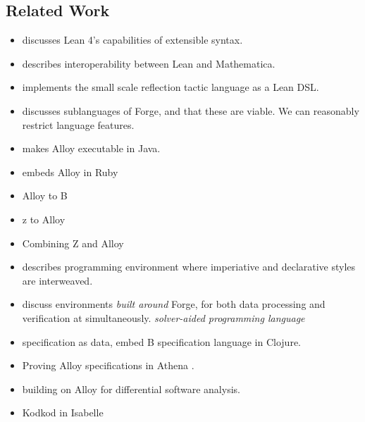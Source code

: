 \subsection{Related Work}\label{sec:bg-related}
{\color{OliveGreen}
\begin{itemize}
    \item \cite{ullrich2022beyond} discusses Lean 4's capabilities of extensible syntax. 
    \item \cite{lewis2022bi} describes interoperability between Lean and Mathematica. 
    \item \cite{gladshtein2024small} implements the small scale reflection tactic language as a Lean DSL. 
    \item \cite{ngpdbccdlrrvwwk-oopsla-2024} discusses sublanguages of Forge, and that these are viable. We can reasonably restrict language features. 
    \item \cite{milicevic2010executable} makes Alloy executable in Java. 
    \item \cite{milicevic2014alpha} embeds Alloy in Ruby
    \item \cite{krings2018translation} Alloy to B 
    \item \cite{malik2010translating} z to Alloy
    \item \cite{mikhailov2002approach} Combining Z and Alloy
    \item \cite{milicevic2015advancing} describes programming environment where imperiative and declarative styles are interweaved. 
    \item \cite{st2023comparison} discuss environments \emph{built around} Forge, for both data processing and verification at simultaneously. \emph{solver-aided programming language}
    \item \cite{korner2022embedding} specification as data, embed B specification language in Clojure. 
    \item \cite{arkoudas2004integrating} Proving Alloy specifications in Athena \cite{arkoudas2000denotational,musser2003proving}.
    \item \cite{nelson2015static} building on Alloy for differential software analysis. 
    \item \cite{blanchette2010nitpick} Kodkod in Isabelle
\end{itemize}}
